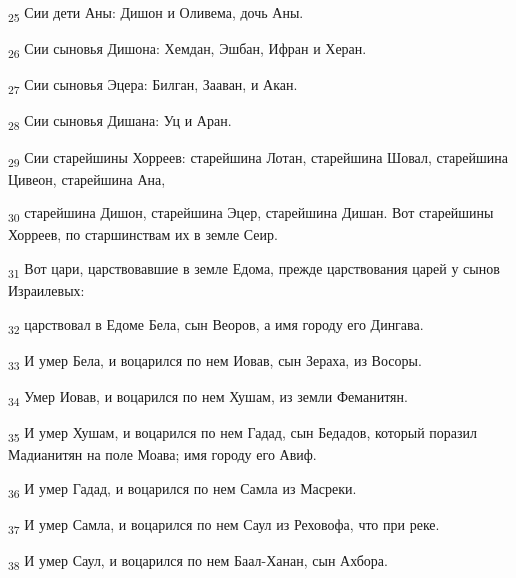 \begin{tcolorbox}
\textsubscript{25} Сии дети Аны: Дишон и Оливема, дочь Аны.
\end{tcolorbox}
\begin{tcolorbox}
\textsubscript{26} Сии сыновья Дишона: Хемдан, Эшбан, Ифран и Херан.
\end{tcolorbox}
\begin{tcolorbox}
\textsubscript{27} Сии сыновья Эцера: Билган, Зааван, и Акан.
\end{tcolorbox}
\begin{tcolorbox}
\textsubscript{28} Сии сыновья Дишана: Уц и Аран.
\end{tcolorbox}
\begin{tcolorbox}
\textsubscript{29} Сии старейшины Хорреев: старейшина Лотан, старейшина Шовал, старейшина Цивеон, старейшина Ана,
\end{tcolorbox}
\begin{tcolorbox}
\textsubscript{30} старейшина Дишон, старейшина Эцер, старейшина Дишан. Вот старейшины Хорреев, по старшинствам их в земле Сеир.
\end{tcolorbox}
\begin{tcolorbox}
\textsubscript{31} Вот цари, царствовавшие в земле Едома, прежде царствования царей у сынов Израилевых:
\end{tcolorbox}
\begin{tcolorbox}
\textsubscript{32} царствовал в Едоме Бела, сын Веоров, а имя городу его Дингава.
\end{tcolorbox}
\begin{tcolorbox}
\textsubscript{33} И умер Бела, и воцарился по нем Иовав, сын Зераха, из Восоры.
\end{tcolorbox}
\begin{tcolorbox}
\textsubscript{34} Умер Иовав, и воцарился по нем Хушам, из земли Феманитян.
\end{tcolorbox}
\begin{tcolorbox}
\textsubscript{35} И умер Хушам, и воцарился по нем Гадад, сын Бедадов, который поразил Мадианитян на поле Моава; имя городу его Авиф.
\end{tcolorbox}
\begin{tcolorbox}
\textsubscript{36} И умер Гадад, и воцарился по нем Самла из Масреки.
\end{tcolorbox}
\begin{tcolorbox}
\textsubscript{37} И умер Самла, и воцарился по нем Саул из Реховофа, что при реке.
\end{tcolorbox}
\begin{tcolorbox}
\textsubscript{38} И умер Саул, и воцарился по нем Баал-Ханан, сын Ахбора.
\end{tcolorbox}
